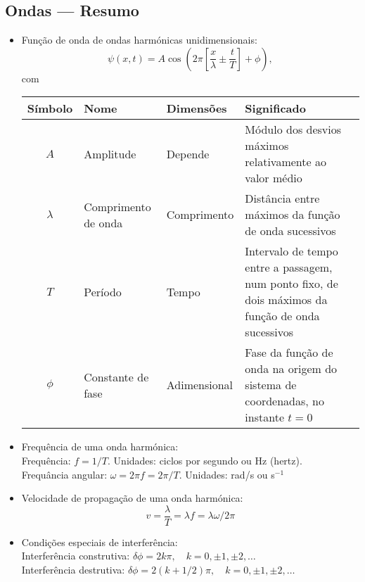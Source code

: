 \subsection{Ondas --- Resumo}
\begin{itemize}
\item
    Função de onda de ondas harmónicas unidimensionais:
    \begin{equation*}
    \psi(x,t)=A\cos\left(2\pi\left[\frac{x}{\lambda}\pm\frac{t}{T}\right]+
                \phi\right),
    \end{equation*}
    com
    \begin{center}
    \begin{tabular}{c|l|l|l}
    \hline
    \rule{0mm}{3ex} Símbolo&Nome&Dimensões&Significado\\[0.5ex]
    \hline
    $A$ & Amplitude & Depende&
        \parbox[t]{0.3\textwidth}{\rule{0mm}{4ex}Módulo dos desvios máxi\-mos
        relativamente ao valor médio}\\
    $\lambda$ & Comprimento de onda & Comprimento &
        \parbox[t]{0.3\textwidth}{\rule{0mm}{4ex}Distância entre máximos da função
        de onda sucessivos} \\
    $T$ & Período & Tempo &
        \parbox[t]{0.3\textwidth}{\rule{0mm}{4ex}Intervalo de tempo entre a
        passagem, num ponto fixo, de dois máximos da função de onda sucessivos}
    \\
    $\phi$&Constante de fase&Adimensional&
        \parbox[t]{0.3\textwidth}{\rule{0mm}{4ex}Fase da função de onda na
        origem do sistema de coordenadas, no instante $t=0$}\\[5ex]
    \hline
    \end{tabular}
    \end{center}
\item Frequência de uma onda harmónica: \\
Frequência: $f=1/T$. Unidades: ciclos por segundo ou Hz (hertz).\\
Frequância angular: $\omega = 2\pi f=2\pi/T$. Unidades: rad/s ou s$^{-1}$
\item Velocidade de propagação de uma onda harmónica:
\begin{equation*}
v=\frac{\lambda}{T}=\lambda f=\lambda \omega/2\pi
\end{equation*}
\item Condições especiais de interferência: \\
Interferência construtiva: $\delta\phi=2k\pi,\quad k=0,\pm1,\pm2,\ldots$\\
Interferência destrutiva: $\delta\phi=2(k+1/2)\pi,\quad k=0,\pm1,\pm2,\ldots$


\end{itemize}
